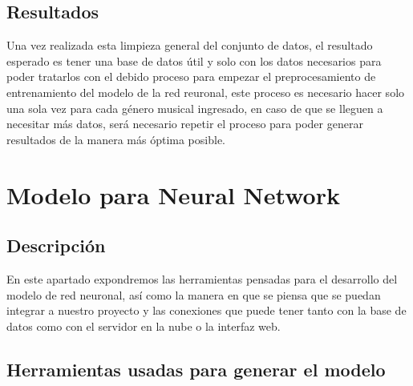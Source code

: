 \documentclass[12pt, a4paper, titlepage]{report}
\begin{document}
		\subsection{Resultados} %
		Una vez realizada esta limpieza general del conjunto de datos, el resultado esperado es tener una base de datos útil y solo con los datos necesarios para poder tratarlos con el debido proceso para empezar el preprocesamiento de entrenamiento del modelo de la red reuronal, este proceso es necesario hacer solo una sola vez para cada género musical ingresado, en caso de que se lleguen a necesitar más datos, será necesario repetir el proceso para poder generar resultados de la manera más óptima posible.
\newpage

\section{Modelo para Neural Network} %
		\subsection{Descripción}
		En este apartado expondremos las herramientas pensadas para el desarrollo del modelo de red neuronal, así como la manera en que se piensa que se puedan integrar a nuestro proyecto y las conexiones que puede tener tanto con la base de datos como con el servidor en la nube o la interfaz web.
		\subsection{Herramientas usadas para generar el modelo} %
\end{document}
